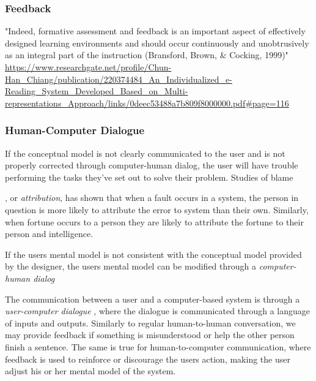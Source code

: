 
\subsubsection{Feedback}
"Indeed, formative assessment and feedback is an important aspect of effectively designed learning environments and should occur continuously and unobtrusively as an integral part of the instruction (Bransford, Brown, \& Cocking, 1999)" \url{https://www.researchgate.net/profile/Chun-Han_Chiang/publication/220374484_An_Individualized_e-Reading_System_Developed_Based_on_Multi-representations_Approach/links/0deec53488a7b809f8000000.pdf#page=116}

\subsubsection{Human-Computer Dialogue}

If the conceptual model is not clearly communicated to the user and is not properly corrected through computer-human dialog, the user will have trouble performing the tasks they've set out to solve their problem. Studies of blame , or \textit{attribution}, has shown that when a fault occurs in a system, the person in question is more likely to attribute the error to system than their own. Similarly, when fortune occurs to a person they are likely to attribute the fortune to their person and intelligence.

If the users mental model is not consistent with the conceptual model provided by the designer, the users mental model can be modified through a \textit{computer-human dialog}

The communication between a user and a computer-based system is through a \textit{user-computer dialogue} \cite{Foley1996}, where the dialogue is communicated through a language of inputs and outputs. Similarly to regular human-to-human conversation, we may provide feedback if something is misunderstood or help the other person finish a sentence. The same is true for human-to-computer communication, where feedback is used to reinforce or discourage the users action, making the user adjust his or her mental model of the system.

